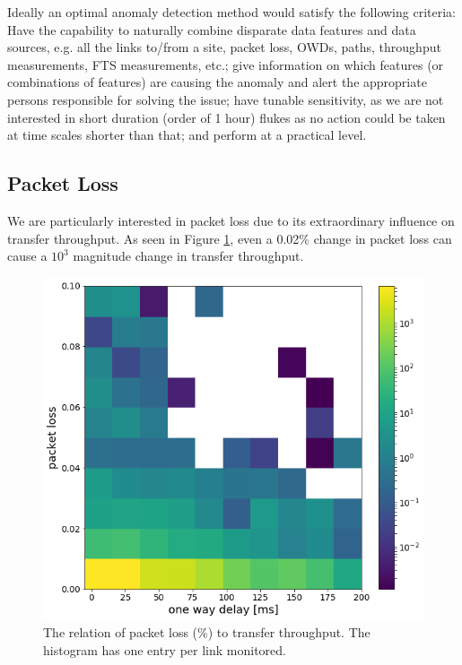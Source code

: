 \documentclass[5p]{elsarticle}
\begin{document}
Ideally an optimal anomaly detection method would satisfy the following criteria: Have the capability to naturally combine disparate data features and data sources, e.g. all the links to/from a site, packet loss, OWDs, paths, throughput measurements, FTS measurements, etc.; give information on which features (or combinations of features) are causing the anomaly and alert the appropriate persons responsible for solving the issue; have tunable sensitivity, as we are not interested in short duration (order of 1 hour) flukes as no action could be taken at time scales shorter than that; and perform at a practical level.

\subsection{Packet Loss}

We are particularly interested in packet loss due to its extraordinary influence on transfer throughput. As seen in Figure \ref{fig:PL}, even a 0.02\% change in packet loss can cause a $10^3$ magnitude change in transfer throughput.

\begin{figure}[htbp]
    \centering
    \includegraphics[width=\linewidth]{PL.png}
    \caption{The relation of packet loss (\%) to transfer throughput.  The histogram has one entry per link monitored.}
    \label{fig:PL}
\end{figure}
\end{document}
